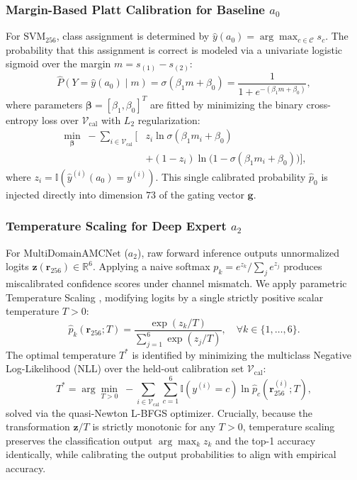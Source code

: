 \subsubsection{Margin-Based Platt Calibration for Baseline $a_0$}
For $\mathrm{SVM}_{256}$, class assignment is determined by $\hat{y}(a_0) = \arg\max_{c \in \mathcal{C}} s_c$. The probability that this assignment is correct is modeled via a univariate logistic sigmoid over the margin $m = s_{(1)} - s_{(2)}$:
\begin{equation}
    \hat{P}(Y = \hat{y}(a_0) \mid m) = \sigma(\beta_1 m + \beta_0) = \frac{1}{1 + e^{-(\beta_1 m + \beta_0)}},
    \label{eq:platt_margin}
\end{equation}
where parameters $\boldsymbol{\beta} = [\beta_1, \beta_0]^T$ are fitted by minimizing the binary cross-entropy loss over $\mathcal{V}_{\mathrm{cal}}$ with $L_2$ regularization:
\begin{align}
    \min_{\boldsymbol{\beta}} \; -\sum_{i \in \mathcal{V}_{\mathrm{cal}}} \Big[ &z_i \ln \sigma(\beta_1 m_i + \beta_0) \nonumber \\
    &+ (1 - z_i) \ln\big(1 - \sigma(\beta_1 m_i + \beta_0)\big) \Big],
    \label{eq:logistic_cal_loss}
\end{align}
where $z_i = \mathbb{I}(\hat{y}^{(i)}(a_0) = y^{(i)})$. This single calibrated probability $\hat{p}_0$ is injected directly into dimension $73$ of the gating vector $\mathbf{g}$.

\subsubsection{Temperature Scaling for Deep Expert $a_2$}
For $\mathrm{MultiDomainAMCNet}$ ($a_2$), raw forward inference outputs unnormalized logits $\mathbf{z}(\mathbf{r}_{256}) \in \mathbb{R}^6$. Applying a naive softmax $p_k = e^{z_k} / \sum_j e^{z_j}$ produces miscalibrated confidence scores under channel mismatch. We apply parametric Temperature Scaling \cite{yang2026uncertainty}, modifying logits by a single strictly positive scalar temperature $T > 0$:
\begin{equation}
    \hat{p}_k(\mathbf{r}_{256}; T) = \frac{\exp(z_k / T)}{\sum_{j=1}^6 \exp(z_j / T)}, \quad \forall k \in \{1, \dots, 6\}.
    \label{eq:temp_scaling}
\end{equation}
The optimal temperature $T^*$ is identified by minimizing the multiclass Negative Log-Likelihood (NLL) over the held-out calibration set $\mathcal{V}_{\mathrm{cal}}$:
\begin{equation}
    T^* = \arg\min_{T > 0} \; -\sum_{i \in \mathcal{V}_{\mathrm{cal}}} \sum_{c=1}^6 \mathbb{I}(y^{(i)} = c) \ln \hat{p}_c(\mathbf{r}_{256}^{(i)}; T),
    \label{eq:temp_nll_opt}
\end{equation}
solved via the quasi-Newton L-BFGS optimizer. Crucially, because the transformation $\mathbf{z} / T$ is strictly monotonic for any $T > 0$, temperature scaling preserves the classification output $\arg\max_k z_k$ and the top-1 accuracy identically, while calibrating the output probabilities to align with empirical accuracy.

